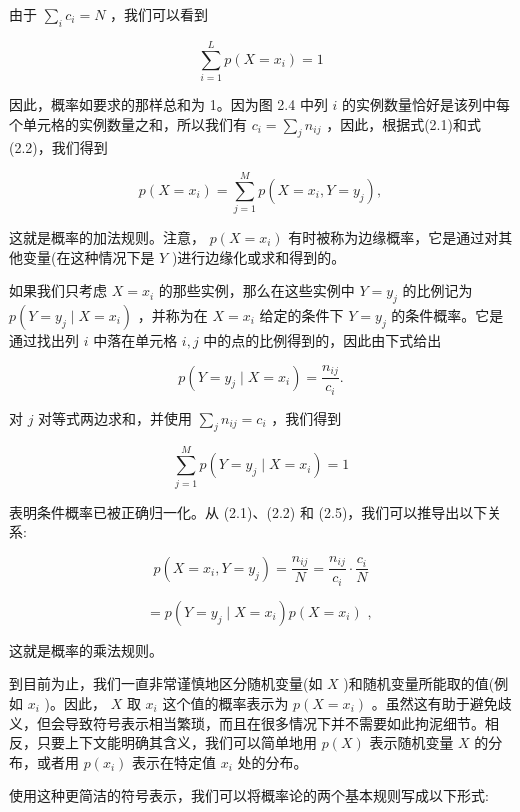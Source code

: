 \documentclass[10pt]{article}
\begin{document}
由于 \(\mathop{\sum }\limits_{i}{c}_{i} = N\) ，我们可以看到

\[
\mathop{\sum }\limits_{{i = 1}}^{L}p\left( {X = {x}_{i}}\right)  = 1 \tag{2.3}
\]

因此，概率如要求的那样总和为 1。因为图 2.4 中列 \(i\) 的实例数量恰好是该列中每个单元格的实例数量之和，所以我们有 \({c}_{i} = \mathop{\sum }\limits_{j}{n}_{ij}\) ，因此，根据式(2.1)和式(2.2)，我们得到

\[
p\left( {X = {x}_{i}}\right)  = \mathop{\sum }\limits_{{j = 1}}^{M}p\left( {X = {x}_{i},Y = {y}_{j}}\right) , \tag{2.4}
\]

这就是概率的加法规则。注意， \(p\left( {X = {x}_{i}}\right)\) 有时被称为边缘概率，它是通过对其他变量(在这种情况下是 \(Y\) )进行边缘化或求和得到的。

如果我们只考虑 \(X = {x}_{i}\) 的那些实例，那么在这些实例中 \(Y = {y}_{j}\) 的比例记为 \(p\left( {Y = {y}_{j} \mid  X = {x}_{i}}\right)\) ，并称为在 \(X = {x}_{i}\) 给定的条件下 \(Y = {y}_{j}\) 的条件概率。它是通过找出列 \(i\) 中落在单元格 \(i,j\) 中的点的比例得到的，因此由下式给出

\[
p\left( {Y = {y}_{j} \mid  X = {x}_{i}}\right)  = \frac{{n}_{ij}}{{c}_{i}}. \tag{2.5}
\]

对 \(j\) 对等式两边求和，并使用 \(\mathop{\sum }\limits_{j}{n}_{ij} = {c}_{i}\) ，我们得到

\[
\mathop{\sum }\limits_{{j = 1}}^{M}p\left( {Y = {y}_{j} \mid  X = {x}_{i}}\right)  = 1 \tag{2.6}
\]

表明条件概率已被正确归一化。从 (2.1)、(2.2) 和 (2.5)，我们可以推导出以下关系:

\[
p\left( {X = {x}_{i},Y = {y}_{j}}\right)  = \frac{{n}_{ij}}{N} = \frac{{n}_{ij}}{{c}_{i}} \cdot  \frac{{c}_{i}}{N}
\]

\[
= p\left( {Y = {y}_{j} \mid  X = {x}_{i}}\right) p\left( {X = {x}_{i}}\right) \text{ , } \tag{2.7}
\]

这就是概率的乘法规则。

到目前为止，我们一直非常谨慎地区分随机变量(如 \(X\) )和随机变量所能取的值(例如 \({x}_{i}\) )。因此， \(X\) 取 \({x}_{i}\) 这个值的概率表示为 \(p\left( {X = {x}_{i}}\right)\) 。虽然这有助于避免歧义，但会导致符号表示相当繁琐，而且在很多情况下并不需要如此拘泥细节。相反，只要上下文能明确其含义，我们可以简单地用 \(p\left( X\right)\) 表示随机变量 \(X\) 的分布，或者用 \(p\left( {x}_{i}\right)\) 表示在特定值 \({x}_{i}\) 处的分布。

使用这种更简洁的符号表示，我们可以将概率论的两个基本规则写成以下形式:
\end{document}
